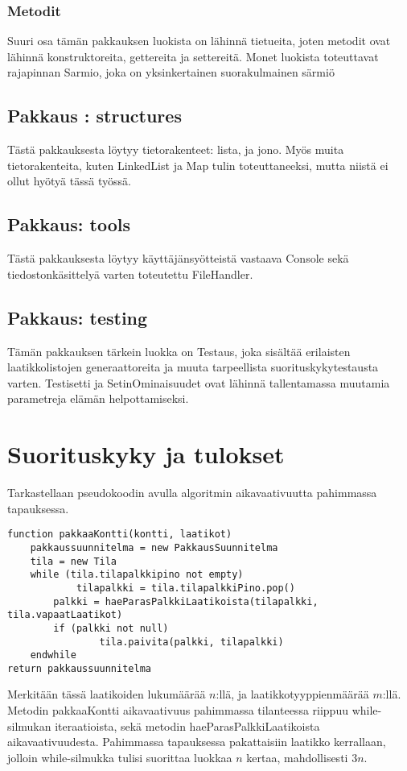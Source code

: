 \documentclass[a4paper,12pt, titlepage]{article}
\begin{document}
\subsubsection*{Metodit}
Suuri osa tämän pakkauksen luokista on lähinnä tietueita, joten metodit ovat lähinnä konstruktoreita, gettereita ja settereitä. Monet luokista toteuttavat rajapinnan Sarmio, joka on yksinkertainen suorakulmainen särmiö
\subsection*{Pakkaus : structures}
Tästä pakkauksesta löytyy tietorakenteet: lista, ja jono. Myös muita tietorakenteita, kuten LinkedList ja Map tulin toteuttaneeksi, mutta niistä ei ollut hyötyä tässä työssä. 
\subsection*{Pakkaus: tools}
Tästä pakkauksesta löytyy käyttäjänsyötteistä vastaava Console sekä tiedostonkäsittelyä varten toteutettu FileHandler.
\subsection*{Pakkaus: testing}
Tämän pakkauksen tärkein luokka on Testaus, joka sisältää erilaisten laatikkolistojen generaattoreita ja muuta tarpeellista suorituskykytestausta varten. Testisetti ja SetinOminaisuudet ovat lähinnä tallentamassa muutamia parametreja elämän helpottamiseksi.


\section*{Suorituskyky ja tulokset}
Tarkastellaan pseudokoodin avulla algoritmin aikavaativuutta pahimmassa tapauksessa.

\begin{verbatim}
function pakkaaKontti(kontti, laatikot) 
    pakkaussuunnitelma = new PakkausSuunnitelma
    tila = new Tila     
    while (tila.tilapalkkipino not empty)
        	tilapalkki = tila.tilapalkkiPino.pop()
        palkki = haeParasPalkkiLaatikoista(tilapalkki, tila.vapaatLaatikot)
        if (palkki not null)
        		tila.paivita(palkki, tilapalkki)
    endwhile
return pakkaussuunnitelma
\end{verbatim}
Merkitään tässä laatikoiden lukumäärää $n$:llä, ja laatikkotyyppienmäärää $m$:llä. Metodin pakkaaKontti aikavaativuus pahimmassa tilanteessa riippuu while-silmukan iteraatioista, sekä metodin haeParasPalkkiLaatikoista aikavaativuudesta. Pahimmassa tapauksessa pakattaisiin laatikko kerrallaan, jolloin while-silmukka tulisi suorittaa luokkaa $n$ kertaa, mahdollisesti  $3n$. 
\end{document}
